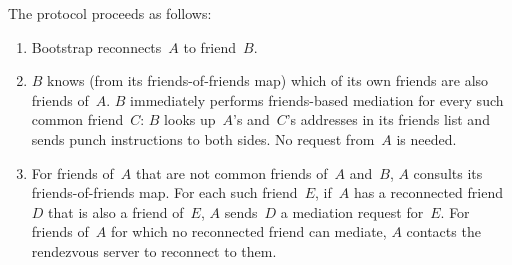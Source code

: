 The protocol proceeds as follows:
\begin{enumerate}
\item Bootstrap reconnects~$A$ to friend~$B$.
\item $B$ knows (from its friends-of-friends map) which of its own friends are also friends of~$A$.  $B$ immediately performs friends-based mediation for every such common friend~$C$: $B$ looks up~$A$'s and~$C$'s addresses in its friends list and sends punch instructions to both sides.  No request from~$A$ is needed.


\item For friends of~$A$ that are not common friends of~$A$ and~$B$, $A$ consults its friends-of-friends map.  For each such friend~$E$, if~$A$ has a reconnected friend~$D$ that is also a friend of~$E$, $A$ sends~$D$ a mediation request for~$E$.  For friends of~$A$ for which no reconnected friend can mediate, $A$ contacts the rendezvous server to reconnect to them.
\end{enumerate}

